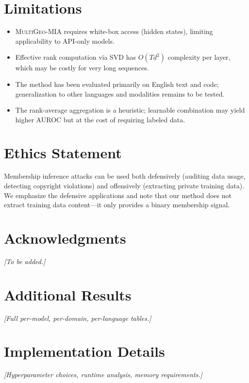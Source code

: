 \documentclass[11pt]{article}
\newcommand{\ours}{\textsc{MultiGeo-MIA}}
\begin{document}
\section*{Limitations}

\begin{itemize}
    \item \ours{} requires white-box access (hidden states), limiting applicability to API-only models.
    \item Effective rank computation via SVD has $O(Td^2)$ complexity per layer, which may be costly for very long sequences.
    \item The method has been evaluated primarily on English text and code; generalization to other languages and modalities remains to be tested.
    \item The rank-average aggregation is a heuristic; learnable combination may yield higher AUROC but at the cost of requiring labeled data.
\end{itemize}

\section*{Ethics Statement}

Membership inference attacks can be used both defensively (auditing data usage, detecting copyright violations) and offensively (extracting private training data).
We emphasize the defensive applications and note that our method does not extract training data content---it only provides a binary membership signal.

\section*{Acknowledgments}

\textit{[To be added.]}



\appendix

\section{Additional Results}
\label{sec:appendix_results}

\textit{[Full per-model, per-domain, per-language tables.]}

\section{Implementation Details}
\label{sec:appendix_implementation}

\textit{[Hyperparameter choices, runtime analysis, memory requirements.]}
\end{document}
